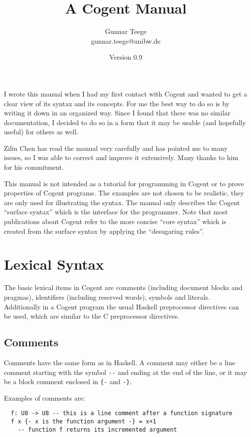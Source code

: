 \documentclass[a4paper]{report}
\newcommand{\code}[1]{\textnormal{\texttt{#1}}}
\newcommand{\cogent}{Cogent\xspace}
\begin{document}
\title{A \cogent Manual}
\author{Gunnar Teege\\ gunnar.teege{@}unibw.de}
\date{Version 0.9}

\maketitle

\cbstart
I wrote this manual when I had my first contact with \cogent and wanted to get a clear view of its syntax and its concepts.
For me the best way to do so is by writing it down in an organized way. Since I found that there was no similar documentation,
I decided to do so in a form that it may be usable (and hopefully useful) for others as well.

Zilin Chen has read the manual very carefully and has pointed me to many issues, so I was able to correct and improve it 
extensively. Many thanks to him for his commitment.

This manual is not intended as a tutorial for programming in \cogent or to prove properties of \cogent programs. The examples
are not chosen to be realistic, they are only used for illustrating the syntax. The manual only describes the \cogent
``surface syntax'' which is the interface for the programmer. Note that most publications about \cogent refer to the more
concise ``core syntax'' which is created from the surface syntax by applying the ``desugaring rules''.
\cbend

\chapter{Lexical Syntax}

\cbstart
The basic lexical items in \cogent are comments (including document blocks and pragmas), identifiers (including reserved words), symbols and literals.
Additionally in a \cogent program the usual Haskell preprocessor directives can be used, which are similar to the C preprocessor directives.
\cbend

\section{Comments}

Comments have the same form as in Haskell. A comment may either be a line comment
starting with the symbol \code{-}\code{-} and ending at the end of the line, or it may
be a block comment enclosed in \code{\{-} and \code{-\}}.

Examples of comments are:
\begin{verbatim}
  f: U8 -> U8 -- this is a line comment after a function signature
  f x {- x is the function argument -} = x+1
    -- function f returns its incremented argument
\end{verbatim}
\end{document}
